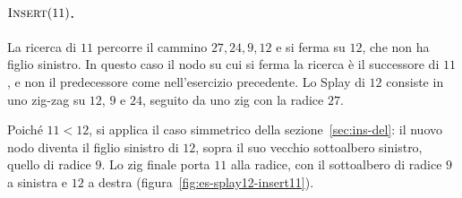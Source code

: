 \paragraph{$\textsc{Insert}(11)$.}
La ricerca di $11$ percorre il cammino $27, 24, 9, 12$ e si ferma su $12$, che non ha figlio sinistro. In questo caso il nodo su cui si ferma la ricerca è il successore di $11$, e non il predecessore come nell'esercizio precedente. Lo Splay di $12$ consiste in uno zig-zag su $12$, $9$ e $24$, seguito da uno zig con la radice $27$.

Poiché $11 < 12$, si applica il caso simmetrico della sezione~\ref{sec:ins-del}: il nuovo nodo diventa il figlio sinistro di $12$, sopra il suo vecchio sottoalbero sinistro, quello di radice $9$. Lo zig finale porta $11$ alla radice, con il sottoalbero di radice $9$ a sinistra e $12$ a destra (figura~\ref{fig:es-splay12-insert11}).

